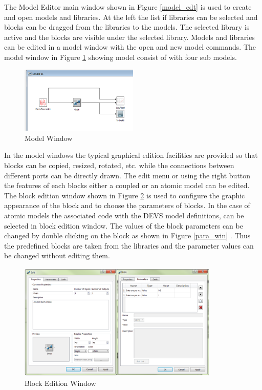 \documentclass[titlepage]{article}%
\begin{document}
The Model Editor main window shown in Figure \ref{model_edt} is used to create and open models and libraries. At the left the list if libraries can be selected and blocks can be dragged from the libraries to the models. The selected library is active and the blocks are visible under the selected library. Models and libraries can be edited in a model window with the open and new model commands. The model window in Figure \ref{model_win} showing model consist of with four sub models.


 \begin{figure}[h!]
  \centering
    \includegraphics[width=0.5\textwidth]{Fig3.png}
    \caption{Model Window}
    \label{model_win}
\end{figure}

In the model windows the typical graphical edition facilities are provided so that blocks can be copied, resized, rotated, etc. while the connections between different ports can be directly drawn. The edit menu or using the right button the features of each blocks either a coupled or an atomic model can be edited. The block edition window shown in Figure \ref{Block_win} is used to configure the graphic appearance of the block and to choose the parameters of blocks. In the case of atomic models the associated code with the DEVS model definitions, can be selected in block edition window. The values of the block parameters can be changed by double clicking on the block as shown in Figure \ref{para_win} . Thus the predefined blocks are taken from the libraries and the parameter values can be changed without editing them.

\begin{figure}[h!]
  \centering
    \includegraphics[width=0.85\textwidth]{Fig4.png}
    \caption{Block Edition Window}
    \label{Block_win}
\end{figure}
\end{document}

